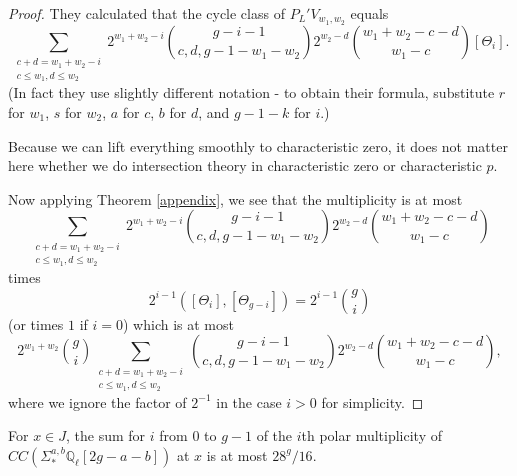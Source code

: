 \begin{proof}
They calculated \cite[Lemma 3.22]{TS} that the cycle class of  $P_L'V_{w_1,w_2}$ equals
\[    \sum_{\substack{c+d = w_1+w_2 -i \\ c \leq w_1, d\leq w_2 }} 2^{ w_1+w_2-i}  {g-i-1 \choose c,d,g-1-w_1-w_2} 2^{w_2-d} {w_1 + w_2 -c -d \choose w_1 -c }  [\Theta_i].\]
(In fact they use slightly different notation - to obtain their formula, substitute $r$ for $w_1$, $s$ for $w_2$, $a$ for $c$, $b$ for $d$, and $g-1-k$ for $i$.)

Because we can lift everything smoothly to characteristic zero, it does not matter here whether we do intersection theory in characteristic zero or characteristic $p$.


Now applying Theorem \ref{appendix}, we see that the multiplicity is at most \[\sum_{\substack{c+d = w_1+w_2 -i \\ c \leq w_1, d\leq w_2 }} 2^{ w_1+w_2-i}  {g-i-1 \choose c,d,g-1-w_1-w_2} 2^{w_2-d} {w_1 + w_2 -c -d \choose w_1 -c }   \] times \[  2^{i-1} ([\Theta_i], [\Theta_{g-i}] )= 2^{i-1} {g \choose i} \]
(or times $1$ if $i=0$) which is at most  \[ 2^{w_1 +w_2} { g \choose i} \sum_{\substack{c+d = w_1+w_2 -i \\ c \leq w_1, d\leq w_2 }} {g-i-1 \choose c,d,g-1-w_1-w_2} 2^{w_2-d} {w_1 + w_2 -c -d \choose w_1 -c },\] where we ignore the factor of $2^{-1}$ in the case $i>0$ for simplicity.

\end{proof}


\begin{lemma}
\notready\label{global-polar-bound} For $x \in J$, the sum for $i$ from $0$ to $g-1$ of the $i$th polar multiplicity of $CC ( \Sigma^{a,b}_* \mathbb Q_\ell[2g-a-b] )$ at $x$ is at most $28^g/16$. \end{lemma}


